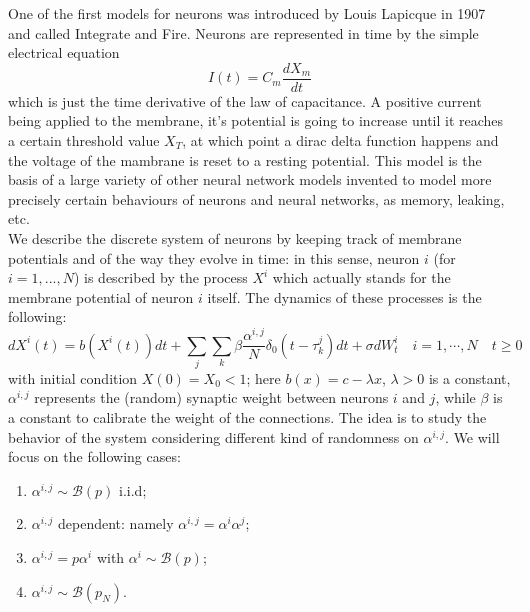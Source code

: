 One of the first models for neurons was introduced by Louis Lapicque in 1907 and called Integrate and Fire. Neurons are represented in time by the simple electrical equation
\begin{equation*}
	I(t)=C_m\frac{dX_m}{dt}
\end{equation*}
which is just the time derivative of the law of capacitance. A positive current being applied to the membrane, it's potential is going to increase until it reaches a certain threshold value $X_T$, at which point a dirac delta function happens and the voltage of the mambrane is reset to a resting potential. This model is the basis of a large variety of other neural network models invented to model more precisely certain behaviours of neurons and neural networks, as memory, leaking, etc.\\
We describe the discrete system of neurons by keeping track of membrane potentials and of the way they evolve in time: in this sense, neuron $i$ (for $i = 1, ..., N$) is described by the process $X^i$ which actually stands for the membrane potential of neuron $i$ itself. The dynamics of these processes is the following:
\begin{equation*}
	dX^{i}(t)=b(X^i(t))dt+\sum_j\sum_k \beta\frac{\alpha^{i,j}}{N}\delta_0(t-\tau^j_k)dt+\sigma dW^i_t\quad i=1,\cdots,N\quad t\geq 0
\end{equation*}
with initial condition $X(0)=X_0<1$; here $b(x)=c-\lambda x$, $\lambda>0$ is a constant, $\alpha^{i,j}$ represents the (random) synaptic weight between neurons $i$ and $j$, while $\beta$ is a constant to calibrate the weight of the connections. The idea is to study the behavior of the system considering different kind of randomness on $\alpha^{i,j}$. We will focus on the following cases:
\begin{enumerate}
	\item $\alpha^{i,j}\sim \mathcal{B}(p)$ i.i.d;
	\item $\alpha^{i,j}$ dependent: namely $\alpha^{i,j}=\alpha^i\alpha^j$;
	\item $\alpha^{i,j}=p\alpha^i$ with $\alpha^i\sim\mathcal{B}(p)$;
	\item $\alpha^{i,j}\sim \mathcal{B}(p_N)$.
\end{enumerate}